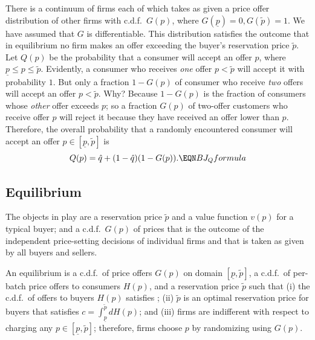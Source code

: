 There is a continuum of firms each of which takes as given  a price offer distribution of other firms  with c.d.f.~$G(p)$, where
$G(\underline p) = 0, G(\tilde p) = 1$.  We have assumed that  $G$ is differentiable. This distribution
    satisfies  the outcome that in equilibrium no firm  makes an offer exceeding
the buyer's reservation price $\tilde p$.  Let $Q(p)$ be the probability that a consumer will accept an offer  $p$,
where $ \underline p \leq p \leq \tilde p$.  Evidently, a consumer who receives {\it one\/} offer  $p < \tilde p$ will accept it
with probability $1$.  But only  a fraction $1-G(p)$ of consumer who receive {\it two\/} offers will accept an offer  $ p < \tilde p$.  Why?
Because $1 - G(p)$ is the fraction of consumers whose {\it other} offer exceeds $p$; so a fraction $G(p)$ of two-offer customers who receive offer $p$ will reject it because they have received an offer lower
than $p$.     Therefore,
the overall probability that a randomly encountered consumer will accept an offer  $ p \in [\underline p, \tilde p]$
is
$$ Q(p) = \hat q + (1-\hat q) (1-G(p)) . \EQN BJ_Qformula $$

\subsection{Equilibrium}

The  objects in play are a reservation price $\tilde p$ and  a value function $v(p)$  for a typical buyer; and
a c.d.f.~$G(p)$  of prices that is the outcome of the independent price-setting decisions of individual firms and that is   taken as given by all buyers and  sellers.

\medskip

An equilibrium is a c.d.f.\ of price offers $G(p)$ on domain $[\underline p, \tilde p]$, a c.d.f.\ of  per-batch price offers to consumers $H(p)$, and a reservation price $\tilde p$ such that (i) the  c.d.f.\ of offers to buyers  $H(p)$ satisfies  ; (ii) $\tilde p$
is an optimal reservation price for buyers that satisfies
$  c = \int_{\underline p}^{\tilde p} d H(p)  $; and (iii) firms are indifferent with respect to charging any
$p \in [\underline p, \tilde p]$; therefore, firms choose $p$ by randomizing using $G(p)$.

